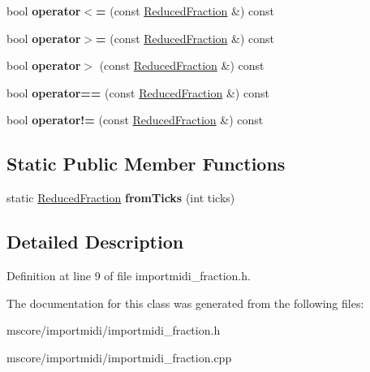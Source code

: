 \begin{DoxyCompactItemize}
\item 
\mbox{\label{class_ms_1_1_reduced_fraction_a17e0cc7ce16365251eb36931a1cb84db}} 
bool {\bfseries operator$<$=} (const \hyperlink{class_ms_1_1_reduced_fraction}{Reduced\+Fraction} \&) const
\item 
\mbox{\label{class_ms_1_1_reduced_fraction_aedb0de6447e8729ba8338c79dff1983f}} 
bool {\bfseries operator$>$=} (const \hyperlink{class_ms_1_1_reduced_fraction}{Reduced\+Fraction} \&) const
\item 
\mbox{\label{class_ms_1_1_reduced_fraction_af94f4fed4da95c82c0f43cf9f1506c5d}} 
bool {\bfseries operator$>$} (const \hyperlink{class_ms_1_1_reduced_fraction}{Reduced\+Fraction} \&) const
\item 
\mbox{\label{class_ms_1_1_reduced_fraction_ad87e0e07a3f7be256a7bc6e6bbe17e76}} 
bool {\bfseries operator==} (const \hyperlink{class_ms_1_1_reduced_fraction}{Reduced\+Fraction} \&) const
\item 
\mbox{\label{class_ms_1_1_reduced_fraction_af305e7671bc6ae6007bd13b2dd857771}} 
bool {\bfseries operator!=} (const \hyperlink{class_ms_1_1_reduced_fraction}{Reduced\+Fraction} \&) const
\end{DoxyCompactItemize}
\subsection*{Static Public Member Functions}
\begin{DoxyCompactItemize}
\item 
\mbox{\label{class_ms_1_1_reduced_fraction_ad41ece8c81419c6fe9808d9f2d6fee93}} 
static \hyperlink{class_ms_1_1_reduced_fraction}{Reduced\+Fraction} {\bfseries from\+Ticks} (int ticks)
\end{DoxyCompactItemize}


\subsection{Detailed Description}


Definition at line 9 of file importmidi\+\_\+fraction.\+h.



The documentation for this class was generated from the following files\+:\begin{DoxyCompactItemize}
\item 
mscore/importmidi/importmidi\+\_\+fraction.\+h\item 
mscore/importmidi/importmidi\+\_\+fraction.\+cpp\end{DoxyCompactItemize}

